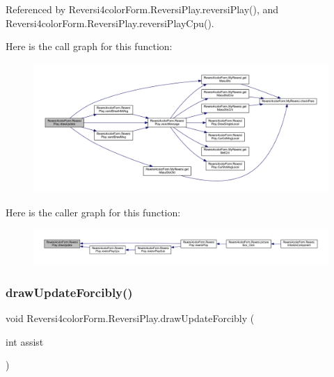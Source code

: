 Referenced by Reversi4color\+Form.\+Reversi\+Play.\+reversi\+Play(), and Reversi4color\+Form.\+Reversi\+Play.\+reversi\+Play\+Cpu().

Here is the call graph for this function\+:\nopagebreak
\begin{figure}[H]
\begin{center}
\leavevmode
\includegraphics[width=350pt]{class_reversi4color_form_1_1_reversi_play_a61428c9797c95359b397564d0bcfa7e7_cgraph}
\end{center}
\end{figure}
Here is the caller graph for this function\+:\nopagebreak
\begin{figure}[H]
\begin{center}
\leavevmode
\includegraphics[width=350pt]{class_reversi4color_form_1_1_reversi_play_a61428c9797c95359b397564d0bcfa7e7_icgraph}
\end{center}
\end{figure}
\mbox{\label{class_reversi4color_form_1_1_reversi_play_a0ef55faf321fa98d44baad4f25ae6940}} 
\subsubsection{\texorpdfstring{draw\+Update\+Forcibly()}{drawUpdateForcibly()}}
{\footnotesize\ttfamily void Reversi4color\+Form.\+Reversi\+Play.\+draw\+Update\+Forcibly (\begin{DoxyParamCaption}\item[{int}]{assist }\end{DoxyParamCaption})}




